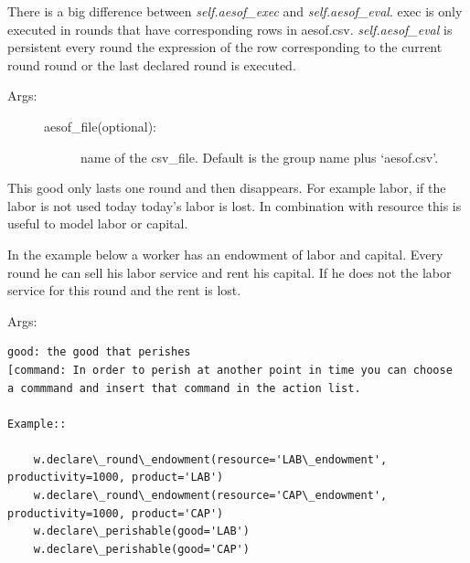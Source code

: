 \documentclass[letterpaper,10pt,english]{sphinxmanual}
\begin{document}
\begin{fulllineitems}
\begin{fulllineitems}
There is a big difference between \emph{self.aesof\_exec} and \emph{self.aesof\_eval}.
exec is only executed in rounds that have corresponding rows in aesof.csv.
\emph{self.aesof\_eval} is persistent every round the expression of the row
corresponding to the current round round or the last declared round is
executed.
\begin{description}
\item[{Args:}] \leavevmode\begin{description}
\item[{aesof\_file(optional):}] \leavevmode
name of the csv\_file. Default is the group name plus `aesof.csv'.

\end{description}

\end{description}

\end{fulllineitems}


\begin{fulllineitems}
\label{simulation:abce.Simulation.declare_perishable}
This good only lasts one round and then disappears. For example
labor, if the labor is not used today today's labor is lost.
In combination with resource this is useful to model labor or capital.

In the example below a worker has an endowment of labor and capital.
Every round he can sell his labor service and rent his capital. If
he does not the labor service for this round and the rent is lost.

Args:

\begin{Verbatim}[commandchars=\\\{\}]
good: the good that perishes
[command: In order to perish at another point in time you can choose
a commmand and insert that command in the action list.

Example::

    w.declare\_round\_endowment(resource='LAB\_endowment', productivity=1000, product='LAB')
    w.declare\_round\_endowment(resource='CAP\_endowment', productivity=1000, product='CAP')
    w.declare\_perishable(good='LAB')
    w.declare\_perishable(good='CAP')
\end{Verbatim}

\end{fulllineitems}


\end{fulllineitems}
\end{document}
